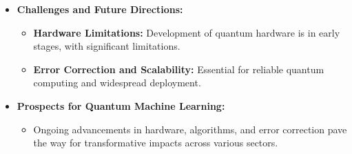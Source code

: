 \documentclass{book}
\begin{document}
\begin{itemize}
    \item \textbf{Challenges and Future Directions:}
    \begin{itemize}
        \item \textbf{Hardware Limitations:} Development of quantum hardware is in early stages, with significant limitations.
        \item \textbf{Error Correction and Scalability:} Essential for reliable quantum computing and widespread deployment.
    \end{itemize}
    
    \item \textbf{Prospects for Quantum Machine Learning:}
    \begin{itemize}
        \item Ongoing advancements in hardware, algorithms, and error correction pave the way for transformative impacts across various sectors.
    \end{itemize}
\end{itemize}
\end{document}
